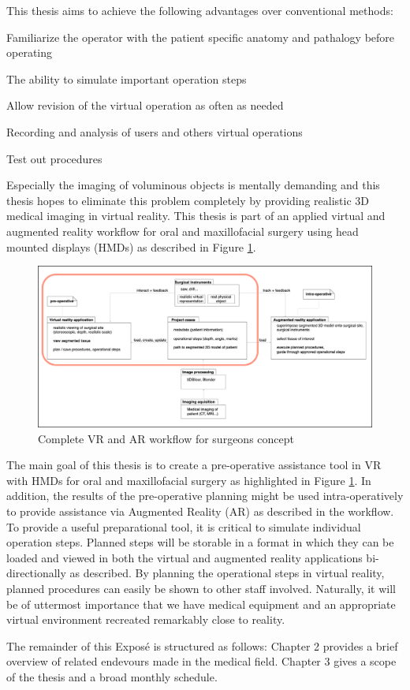 This thesis aims to achieve the following advantages over conventional methods:
\begin{compactenum}[label=(\alph*)]
    \item Familiarize the operator with the patient specific anatomy and pathalogy before operating
    \item The ability to simulate important operation steps
    \item Allow revision of the virtual operation as often as needed
    \item Recording and analysis of users and others virtual operations
    \item Test out procedures
\end{compactenum}

Especially the imaging of voluminous objects is mentally demanding and this thesis hopes to eliminate this problem completely by providing realistic 3D medical imaging in virtual reality.
This thesis is part of an applied virtual and augmented reality workflow for oral and maxillofacial surgery using head mounted displays (HMDs) as described in Figure \ref{fig::ProjectPlan}.

\begin{figure}[ht!]
    \centering
    \includegraphics[width=\linewidth]{images/project_plan.png}
    \caption{\label{fig::ProjectPlan} Complete VR and AR workflow for surgeons concept}
\end{figure}

The main goal of this thesis is to create a pre-operative assistance tool in VR with HMDs for oral and maxillofacial surgery as highlighted in Figure \ref{fig::ProjectPlan}. 
In addition, the results of the pre-operative planning might be used intra-operatively to provide assistance via Augmented Reality (AR) as described in the workflow.
To provide a useful preparational tool, it is critical to simulate individual operation steps.
Planned steps will be storable in a format in which they can be loaded and viewed in both the virtual and augmented reality applications bi-directionally as described.
By planning the operational steps in virtual reality, planned procedures can easily be shown to other staff involved.
Naturally, it will be of uttermost importance that we have medical equipment and an appropriate virtual environment recreated remarkably close to reality.

The remainder of this Exposé is structured as follows: Chapter 2 provides a brief overview of related endevours made in the medical field.
Chapter 3 gives a scope of the thesis and a broad monthly schedule.